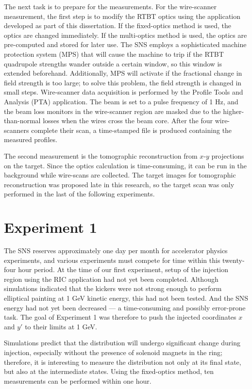 The next task is to prepare for the measurements. For the wire-scanner measurement, the first step is to modify the RTBT optics using the application developed as part of this dissertation. If the fixed-optics method is used, the optics are changed immediately. If the multi-optics method is used, the optics are pre-computed and stored for later use. The SNS employs a sophisticated machine protection system (MPS) that will cause the machine to trip if the RTBT quadrupole strengths wander outside a certain window, so this window is extended beforehand. Additionally, MPS will activate if the fractional change in field strength is too large; to solve this problem, the field strength is changed in small steps. Wire-scanner data acquisition is performed by the Profile Tools and Analysis (PTA) application. The beam is set to a pulse frequency of 1 Hz, and the beam loss monitors in the wire-scanner region are masked due to the higher-than-normal losses when the wires cross the beam core. After the four wire-scanners complete their scan, a time-stamped file is produced containing the measured profiles.

The second measurement is the tomographic reconstruction from $x$-$y$ projections on the target. Since the optics calculation is time-consuming, it can be run in the background while wire-scans are collected. The target images for tomographic reconstruction was proposed late in this research, so the target scan was only performed in the last of the following experiments.


\section{Experiment 1}

The SNS reserves approximately one day per month for accelerator physics experiments, and various experiments must compete for time within this twenty-four hour period. At the time of our first experiment, setup of the injection region using the RIC application had not yet been completed. Although simulations indicated that the kickers were not strong enough to perform elliptical painting at 1 GeV kinetic energy, this had not been tested. And the SNS energy had not yet been decreased — a time-consuming and possibly error-prone task. The goal of Experiment 1 was therefore to push the injected coordinates $x$ and $y'$ to their limits at 1 GeV.

Simulations predict that the distribution will undergo significant change during injection, especially without the presence of solenoid magnets in the ring; therefore, it is interesting to measure the distribution not only at its final state, but also at the intermediate states. Using the fixed-optics method, ten measurements can be performed within one hour. 


